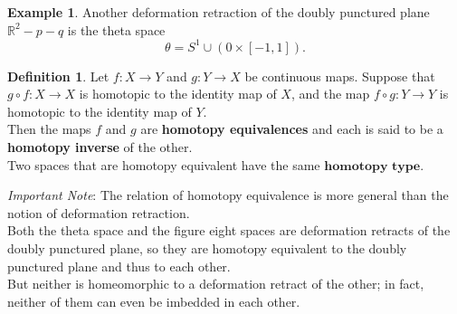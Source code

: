 \documentclass[11pt]{article}
\newcommand{\R}{\mathbb{R}}
\theoremstyle{definition}
\theoremstyle{theorem}
\newtheorem*{definition}{Definition}
\newtheorem*{eg}{Example}
\begin{document}
\begin{eg}
Another deformation retraction of the doubly punctured plane $\R^2 - p - q$ is the theta space
\[
    \theta = S^1 \cup (0 \times [-1, 1]).
\]
\end{eg}

\begin{definition}
Let $f \colon X \rightarrow Y$ and $g \colon Y \rightarrow X$ be continuous maps. Suppose that $g \circ f \colon X \rightarrow X$ is homotopic to the identity map of $X$, and the map $f \circ g \colon Y \rightarrow Y$ is homotopic to the identity map of $Y$. \\

Then the maps $f$ and $g$ are \textbf{homotopy equivalences} and each is said to be a \textbf{homotopy inverse} of the other. \\

Two spaces that are homotopy equivalent have the same $\textbf{homotopy type}$.
\end{definition}

\textit{Important Note}: The relation of homotopy equivalence is more general than the notion of deformation retraction. \\

Both the theta space and the figure eight spaces are deformation retracts of the doubly punctured plane, so they are homotopy equivalent to the doubly punctured plane and thus to each other. \\

But neither is homeomorphic to a deformation retract of the other; in fact, neither of them can even be imbedded in each other. 
\end{document}
